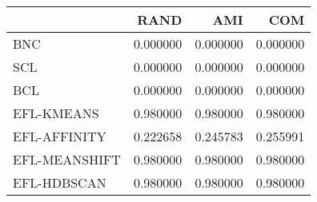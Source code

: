 \begin{tabular}{lrrr}
\toprule
 & RAND & AMI & COM \\
\midrule
BNC & 0.000000 & 0.000000 & 0.000000 \\
SCL & 0.000000 & 0.000000 & 0.000000 \\
BCL & 0.000000 & 0.000000 & 0.000000 \\
EFL-KMEANS & 0.980000 & 0.980000 & 0.980000 \\
EFL-AFFINITY & 0.222658 & 0.245783 & 0.255991 \\
EFL-MEANSHIFT & 0.980000 & 0.980000 & 0.980000 \\
EFL-HDBSCAN & 0.980000 & 0.980000 & 0.980000 \\
\bottomrule
\end{tabular}
